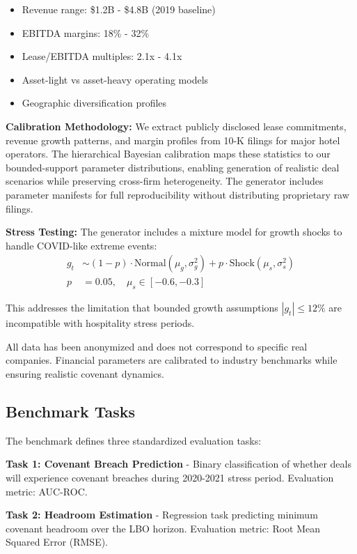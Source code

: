 \documentclass[11pt,a4paper]{article}
\begin{document}
\begin{itemize}
\item Revenue range: \$1.2B - \$4.8B (2019 baseline)
\item EBITDA margins: 18\% - 32\%  
\item Lease/EBITDA multiples: 2.1x - 4.1x
\item Asset-light vs asset-heavy operating models
\item Geographic diversification profiles
\end{itemize}

\textbf{Calibration Methodology:} We extract publicly disclosed lease commitments, revenue growth patterns, and margin profiles from 10-K filings for major hotel operators. The hierarchical Bayesian calibration maps these statistics to our bounded-support parameter distributions, enabling generation of realistic deal scenarios while preserving cross-firm heterogeneity. The generator includes parameter manifests for full reproducibility without distributing proprietary raw filings.

\textbf{Stress Testing:} The generator includes a mixture model for growth shocks to handle COVID-like extreme events:
\begin{align}
g_t &\sim (1-p) \cdot \text{Normal}(\mu_g, \sigma_g^2) + p \cdot \text{Shock}(\mu_s, \sigma_s^2) \\
p &= 0.05, \quad \mu_s \in [-0.6, -0.3]
\end{align}

This addresses the limitation that bounded growth assumptions $|g_t| \leq 12\%$ are incompatible with hospitality stress periods.

All data has been anonymized and does not correspond to specific real companies. Financial parameters are calibrated to industry benchmarks while ensuring realistic covenant dynamics.

\subsection{Benchmark Tasks}

The benchmark defines three standardized evaluation tasks:

\textbf{Task 1: Covenant Breach Prediction} - Binary classification of whether deals will experience covenant breaches during 2020-2021 stress period. Evaluation metric: AUC-ROC.

\textbf{Task 2: Headroom Estimation} - Regression task predicting minimum covenant headroom over the LBO horizon. Evaluation metric: Root Mean Squared Error (RMSE).
\end{document}
